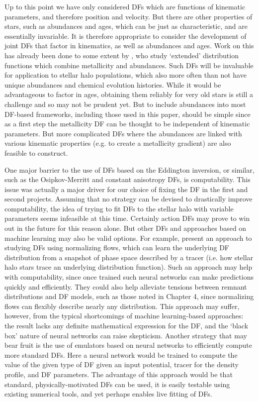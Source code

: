 Up to this point we have only considered DFs which are functions of kinematic parameters, and therefore position and velocity. But there are other properties of stars, such as abundances and ages, which can be just as characteristic, and are essentially invariable. It is therefore appropriate to consider the development of joint DFs that factor in kinematics, as well as abundances and ages. Work on this has already been done to some extent by \textcite{sanders15b}, who study `extended' distribution functions which combine metallicity and abundances. Such DFs will be invaluable for application to stellar halo populations, which also more often than not have unique abundances and chemical evolution histories. While it would be advantageous to factor in ages, obtaining them reliably for very old stars is still a challenge and so may not be prudent yet. But to include abundances into most DF-based frameworks, including those used in this paper, should be simple since as a first step the metallicity DF can be thought to be independent of kinematic parameters. But more complicated DFs where the abundances are linked with various kinematic properties (e.g. to create a metallicity gradient) are also feasible to construct.

One major barrier to the use of DFs based on the Eddington inversion, or similar, such as the Osipkov-Merritt and constant anisotropy DFs, is computability. This issue was actually a major driver for our choice of fixing the DF in the first and second projects. Assuming that no strategy can be devised to drastically improve computability, the idea of trying to fit DFs to the stellar halo with variable parameters seems infeasible at this time. Certainly action DFs may prove to win out in the future for this reason alone. But other DFs and approaches based on machine learning may also be valid options. For example, \textcite{green23} present an approach to studying DFs using normalizing flows, which can learn the underlying DF distribution from a snapshot of phase space described by a tracer (i.e. how stellar halo stars trace an underlying distribution function). Such an approach may help with computability, since once trained such neural networks can make predictions quickly and efficiently. They could also help alleviate tensions between remnant distributions and DF models, such as those noted in Chapter 4, since normalizing flows can flexibly describe nearly any distribution. This approach may suffer, however, from the typical shortcomings of machine learning-based approaches: the result lacks any definite mathematical expression for the DF, and the `black box' nature of neural networks can raise skepticism. Another strategy that may bear fruit is the use of emulators based on neural networks to efficiently compute more standard DFs. Here a neural network would be trained to compute the value of the given type of DF given an input potential, tracer for the density profile, and DF parameters. The advantage of this approach would be that standard, physically-motivated DFs can be used, it is easily testable using existing numerical tools, and yet perhaps enables live fitting of DFs.

